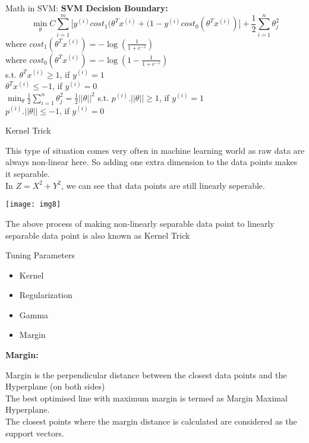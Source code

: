 \documentclass{beamer}
\newcommand\myheading[1]{%
  \par\bigskip
  {\large\bfseries#1}\par\smallskip}
\begin{document}
\begin{frame}{Math in SVM:}
	\textbf{SVM Decision Boundary:}
	\begin{equation*}
		\min_\theta C \sum_{i=1}^{m}{\bigg[y^{(i)} cost_1(\theta^Tx^{(i)} + (1-y^{(i)} cost_0(\theta^Tx^{(i)})\bigg]} + \frac{1}{2}\sum_{i=1}^{n}{\theta_j^{2}}
	\end{equation*}
	where $cost_1(\theta^Tx^{(i)}) = -\log(\frac{1}{1+e^{-z}})$\\
\vspace{10pt}
	where $cost_0(\theta^Tx^{(i)}) = -\log (1 -\frac{1}{1+e^{-z}})$\\
\vspace{10pt}
	s.t. $\theta^Tx^{(i)} \geq 1$, if $y^{(i)} = 1$\\
	\vspace{10pt}
	$\theta^Tx^{(i)} \leq -1$, if $y^{(i)} = 0$\\
\vspace{10pt}
	$\min_\theta \frac{1}{2}\sum_{i=1}^{n}{\theta_j^{2}} = \frac{1}{2}||\theta||^2$
	s.t. $p^{(i)}.||\theta|| \geq 1$, if $y^{(i)} = 1$\\
	\vspace{10pt}
	$p^{(i)}.||\theta|| \leq -1$, if $y^{(i)} = 0$
\end{frame}

\begin{frame}{Kernel Trick}
	\begin{flushleft}
		This type of situation comes very often in machine learning world as raw data are always non-linear here. So adding one extra dimension to the data points makes it separable.\\
\vspace{10pt}
In $Z = X^2 + Y^2$, we can see that data points are still linearly seperable.
	\end{flushleft}
	\texttt{[image: img8]}
	\begin{flushleft}
	The above process of making non-linearly separable data point to linearly separable data point is also known as Kernel Trick
	\end{flushleft}
\end{frame}

\begin{frame}{Tuning Parameters}
	\begin{flushleft}
		\begin{itemize}
			\item Kernel
			\item Regularization
			\item Gamma
			\item Margin
		\end{itemize}
		\myheading{Margin:}
		Margin is the perpendicular distance between the closest data points and the Hyperplane (on both sides)\\
		\vspace{10pt}
		The best optimised line with maximum margin is termed as Margin Maximal Hyperplane.\\
		\vspace{10pt}
		The closest points where the margin distance is calculated are considered as the support vectors. 
	\end{flushleft}
\end{frame}
\end{document}
